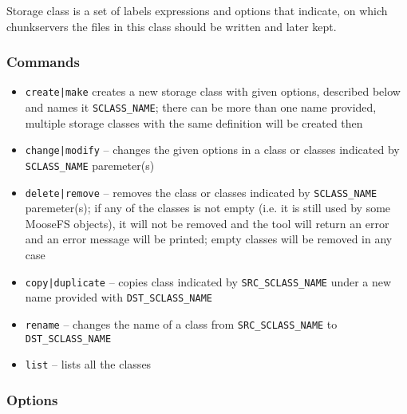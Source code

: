 \documentclass[a4paper,11pt,english]{report}
\def\code#1{\texttt{#1}}
\begin{document}
					Storage class is a set of labels expressions and options that indicate, on which chunkservers the files in this class should be written and later kept.
				
				\subsubsection{Commands}
					
					\begin{itemize}
						\item \code{create|make} creates a new storage class with given options, described below and names it \code{SCLASS\_NAME}; there can be more than one name provided, multiple storage classes with the same definition will be created then
					
						\item \code{change|modify} -- changes the given options in a class or classes indicated by \code{SCLASS\_NAME} paremeter(s)
					
						\item \code{delete|remove} -- removes the class or classes indicated by \code{SCLASS\_NAME} paremeter(s); if any of the classes is not empty (i.e. it is still used by some MooseFS objects), it will not be removed and the tool will return an error and an error message will be printed; empty classes will be removed in any case
					
						\item \code{copy|duplicate} -- copies class indicated by \code{SRC\_SCLASS\_NAME} under a new name provided with \code{DST\_SCLASS\_NAME}
						
						\item \code{rename} -- changes the name of a class from \code{SRC\_SCLASS\_NAME} to \code{DST\_SCLASS\_NAME}
						
						\item \code{list} -- lists all the classes
					\end{itemize}
				
				\subsubsection{Options}
					
\end{document}
